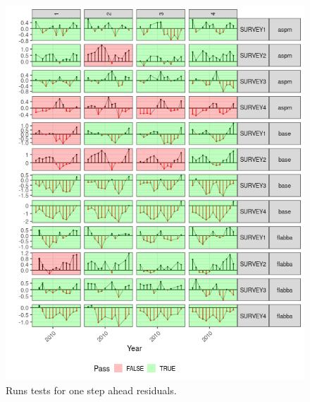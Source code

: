 \documentclass[a4paper]{article}
\begin{document}
\begin{figure}[htbp]
\centering
\includegraphics[width=6in]{final-cpue-prediction-runs-1.png}
\caption{Runs tests for one step ahead residuals.}
\label{fig:runshat}
\end{figure}
\end{document}
